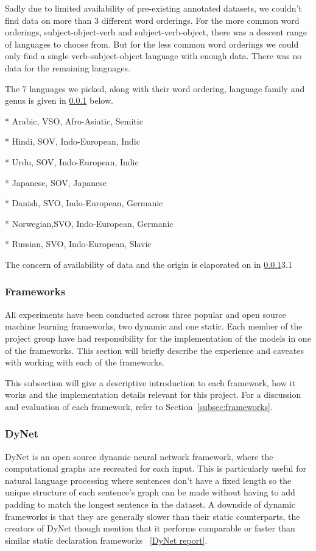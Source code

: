 Sadly due to limited availability of pre-existing annotated datasets, we
couldn't find data on more than 3 different word orderings. For the more common
word orderings, subject-object-verb and subject-verb-object, there was a descent
range of languages to choose from. But for the less common word orderings we
could only find a single verb-subject-object language with enough data. There
was no data for the remaining languages. 

The 7 languages we picked, along with their word ordering, language family and
genus is given in \ref{} below.

* Arabic,   VSO, Afro-Asiatic, Semitic 

* Hindi,    SOV, Indo-European, Indic

* Urdu,     SOV, Indo-European, Indic

* Japanese, SOV, Japanese

* Danish,   SVO, Indo-European, Germanic

* Norwegian,SVO, Indo-European, Germanic

* Russian,  SVO, Indo-European, Slavic

The concern of availability of data and the origin is elaporated on in
\ref{}{3.1}


\subsubsection{Frameworks}

All experiments have been conducted across three popular and open source machine
learning frameworks, two dynamic and one static. Each member of the project
group have had responsibility for the implementation of the models in one of the
frameworks. This section will briefly describe the experience and caveates with
working with each of the frameworks.

This subsection will give a descriptive introduction to each framework, how it
works and the implementation details relevant for this project. For a discussion
and evaluation of each framework, refer to Section~\ref{subsec:frameworks}.


\subsubsection*{DyNet}

DyNet is an open source dynamic neural network framework, where the
computational graphs are recreated for each input. This is particularly useful
for natural language processing where sentences don't have a fixed length so the
unique structure of each sentence's graph can be made without having to add
padding to match the longest sentence in the dataset. A downside of dynamic
frameworks is that they are generally slower than their static counterparts,
the creators of DyNet though mention that it performs comparable or faster than
similar static declaration frameworks ~\ref{DyNet report}.   

